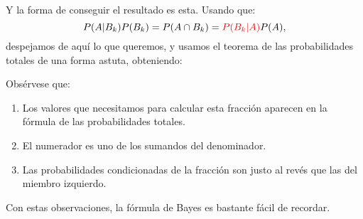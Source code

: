 \begin{itemize}
        Y la forma de conseguir el resultado es esta. Usando que:
        \[P(A|B_k)P(B_k)=P(A\cap B_k)=\textcolor{red}{P(B_k|A)}P(A),\]
        despejamos de aquí lo que queremos, y usamos el teorema de las probabilidades totales de una forma astuta, obteniendo:
        \begin{center}
        \end{center}
        Obsérvese que:
        \begin{enumerate}
        \item Los valores que necesitamos para calcular esta fracción aparecen en la fórmula de las probabilidades totales.
        \item El numerador es uno de los sumandos del denominador.
        \item Las probabilidades condicionadas de la fracción son justo al revés que las del miembro izquierdo.
        \end{enumerate}
        Con estas observaciones, la fórmula de Bayes es bastante fácil de recordar.


\end{itemize}
